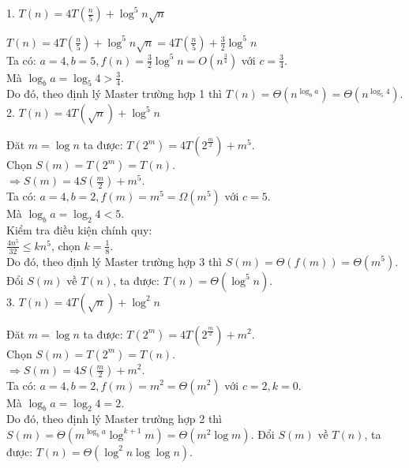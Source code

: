 \documentclass[12pt, a4paper, fleqn]{article}
\begin{document}
		1. $\displaystyle
		T(n) = 4T\left( \frac{n}{5} \right) + \log^{5}{n \sqrt{n}}$
		
		$\displaystyle
		T(n) = 4T\left( \frac{n}{5} \right) + \log^{5}{n \sqrt{n}} = 4T\left( \frac{n}{5} \right) + \frac{3}{2} \log^{5} n$\\
		Ta có: $\displaystyle
		a = 4, b = 5, f(n) = \frac{3}{2} \log^{5} n = O \left( n^\frac{3}{4} \right)$ với $\displaystyle
		c = \frac{3}{4}$.\\
		Mà $\displaystyle
		\log_{b} a = \log_{5} 4 > \frac{3}{4}$.\\
		Do đó, theo định lý Master trường hợp 1 thì $T(n) = \Theta \left( n^{\log_{b} a} \right) = \Theta (n^{\log_{5} 4})$.
		\\
					
		2. $T(n) = 4T\left( \sqrt{n} \right) + \log^{5} n$
		
		Đăt $m = \log n$ ta được: $\displaystyle
		T(2 ^ m) = 4T\left(2 ^ {\frac{m}{2}}\right) + m^5 $.\\
		Chọn $S(m) = T(2 ^ m) = T(n)$.\\
		$\displaystyle
		\Rightarrow S(m) = 4S \left( \frac{m}{2} \right) + m^5$.\\
		Ta có: $a = 4, b = 2, f(m) = m^5 = \Omega (m^5)$ với $c = 5$.\\
		Mà $\log_{b} a = \log_{2} 4 < 5$.\\
		Kiểm tra điều kiện chính quy:\\
		$\displaystyle
		\frac{4n^5}{32} \leq kn^5$, chọn $\displaystyle
		k = \frac{1}{8}$.\\
		Do đó, theo định lý Master trường hợp 3 thì $S(m) = \Theta (f(m)) = \Theta (m^5)$.\\
		Đổi $S(m)$ về $T(n)$, ta được: $T(n) = \Theta (\log^{5} n)$.
		\\
		
		3. $T(n) = 4T\left( \sqrt{n} \right) + \log^{2} n$
		
		Đăt $m = \log n$ ta được: $\displaystyle
		T(2 ^ m) = 4T\left(2 ^ {\frac{m}{2}}\right) + m^2 $.\\
		Chọn $S(m) = T(2 ^ m) = T(n)$.\\
		$\displaystyle
		\Rightarrow S(m) = 4S \left( \frac{m}{2} \right) + m^2$.\\
		Ta có: $a = 4, b = 2, f(m) = m^2 = \Theta (m^2)$ với $c = 2, k = 0$.\\
		Mà $\log_{b} a = \log_{2} 4 = 2$.\\
		Do đó, theo định lý Master trường hợp 2 thì $S(m) = \Theta \left( m^{\log_{b} a} \log^{k + 1} m \right) = \Theta (m^2\log m)$.
		Đổi $S(m)$ về $T(n)$, ta được: $T(n) = \Theta (\log^{2} n \log {\log n})$.
		\clearpage
		
\end{document}
